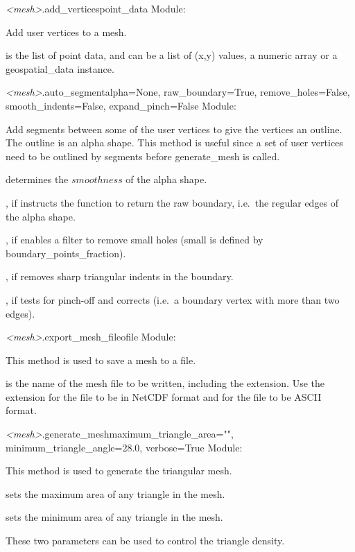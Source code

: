 \documentclass{manual}
\begin{document}
\begin{methoddesc}{\emph{<mesh>}.add_vertices}{point_data}
Module: 

Add user vertices to a mesh.

 is the list of point data, and can be a list of (x,y) values,
a numeric array or a geospatial_data instance.
\end{methoddesc}

\begin{methoddesc}{\emph{<mesh>}.auto_segment}{alpha=None,
                                               raw_boundary=True,
                                               remove_holes=False,
                                               smooth_indents=False,
                                               expand_pinch=False}
Module: 

Add segments between some of the user vertices to give the vertices an
outline.  The outline is an alpha shape. This method is
useful since a set of user vertices need to be outlined by segments
before generate_mesh is called.

 determines the $smoothness$ of the alpha shape.

, if  instructs the function to return the raw
boundary, i.e.\ the regular edges of the alpha shape.

, if  enables a filter to remove small holes
(small is defined by  boundary_points_fraction).

, if  removes sharp triangular indents
in the boundary.

, if  tests for pinch-off and corrects
(i.e.\ a boundary vertex with more than two edges).
\end{methoddesc}

\begin{methoddesc}{\emph{<mesh>}.export_mesh_file}{ofile}
Module: 

This method is used to save a mesh to a file.

 is the name of the mesh file to be written, including the extension.
Use the extension  for the file to be in NetCDF format and
 for the file to be ASCII format.
\end{methoddesc}

\begin{methoddesc}{\emph{<mesh>}.generate_mesh}{maximum_triangle_area="",
                                                minimum_triangle_angle=28.0,
                                                verbose=True}
Module: 

This method is used to generate the triangular mesh.

 sets the maximum area of any triangle in the mesh.

 sets the minimum area of any triangle in the mesh.

These two parameters can be used to control the triangle density.
\end{methoddesc}
\end{document}
